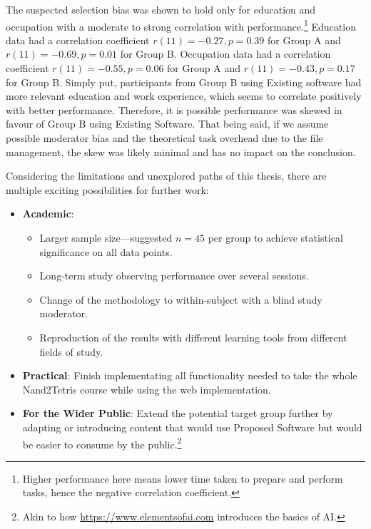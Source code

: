 The suspected selection bias was shown to hold only for education and occupation with a moderate to strong correlation with performance.\footnote{Higher performance here means lower time taken to prepare and perform tasks, hence the negative correlation coefficient.}
Education data had a correlation coefficient $r(11) = -0.27, p = 0.39$ for Group A and $r(11) = -0.69, p = 0.01$ for Group B.
Occupation data had a correlation coefficient $r(11) = -0.55, p = 0.06$ for Group A and $r(11) = -0.43, p = 0.17$ for Group B.
Simply put, participants from Group B using Existing software had more relevant education and work experience, which seems to correlate positively with better performance.
Therefore, it is possible performance was skewed in favour of Group B using Existing Software.
That being said, if we assume possible moderator bias and the theoretical task overhead due to the file management, the skew was likely minimal and has no impact on the conclusion.

Considering the limitations and unexplored paths of this thesis, there are multiple exciting possibilities for further work:

\begin{itemize}
    \item \textbf{Academic}:
    \begin{itemize}
        \item Larger sample size---suggested $n=45$ per group to achieve statistical significance on all data points.
        \item Long-term study observing performance over several sessions.
        \item Change of the methodology to within-subject with a blind study moderator.
        \item Reproduction of the results with different learning tools from different fields of study.
    \end{itemize}
    \item \textbf{Practical}: Finish implementating all functionality needed to take the whole Nand2Tetris course while using the web implementation.
    \item \textbf{For the Wider Public}: Extend the potential target group further by adapting or introducing content that would use Proposed Software but would be easier to consume by the public.\footnote{Akin to how \url{https://www.elementsofai.com} introduces the basics of AI.}
\end{itemize}
